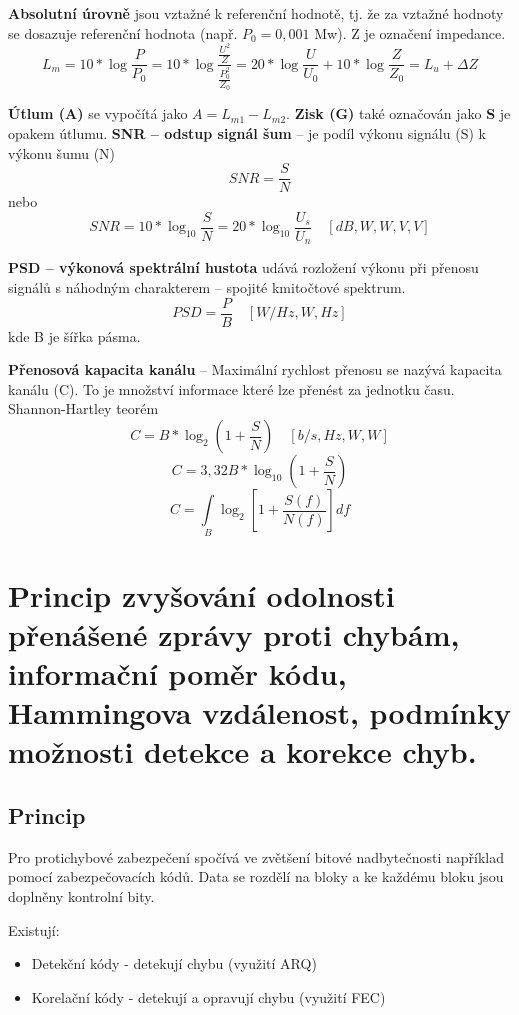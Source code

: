 \textbf{Absolutní úrovně} jsou vztažné k referenční hodnotě, tj. že za vztažné hodnoty se dosazuje referenční hodnota (např. $P_0 = 0,001$ Mw). Z je označení impedance.
\[L_m = 10*\log\frac{P}{P_0} = 10*\log\frac{\frac{U^2}{Z}}{\frac{P^2_0}{Z_0}} = 20*\log\frac{U}{U_0} + 10*\log\frac{Z}{Z_0} = L_u + \Delta Z\]

\textbf{Útlum (A)} se vypočítá jako $A = L_{m1} - L_{m2}$.
\newline\textbf{Zisk (G)} také označován jako \textbf{S} je opakem útlumu.
\newline\textbf{SNR -- odstup signál šum} -- je podíl výkonu signálu (S) k výkonu šumu (N)\[SNR = \frac{S}{N}\] nebo \[SNR = 10*\log_{10}\frac{S}{N} = 20*\log_{10}\frac{U_s}{U_n} \quad [dB, W, W, V, V]\]

\textbf{PSD -- výkonová spektrální hustota} udává rozložení výkonu při přenosu signálů s náhodným charakterem -- spojité kmitočtové spektrum. \[PSD = \frac{P}{B} \quad [W/Hz, W, Hz]\] kde B je šířka pásma.

\textbf{Přenosová kapacita kanálu} -- Maximální rychlost přenosu se nazývá kapacita kanálu (C). To je množství informace které lze přenést za jednotku času. Shannon-Hartley teorém
\[C = B*\log_2(1 + \frac{S}{N}) \quad [b/s, Hz, W, W]\]
\[C = 3,32B*\log_10(1 + \frac{S}{N})\]
\[C = \int\limits_B{\log_2\left[1 + \frac{S(f)}{N(f)}\right]df}\]


\clearpage
\section{Princip zvyšování odolnosti přenášené zprávy proti chybám, informační poměr kódu, Hammingova vzdálenost, podmínky možnosti detekce a korekce chyb.}

\subsection{Princip}

Pro protichybové zabezpečení spočívá ve zvětšení bitové nadbytečnosti například pomocí zabezpečovacích kódů. Data se rozdělí na bloky a ke každému bloku jsou doplněny kontrolní bity.

Existují:
\begin{itemize}
    \item Detekční kódy - detekují chybu (využití ARQ)
    \item Korelační kódy - detekují a opravují chybu (využití FEC)
\end{itemize}

